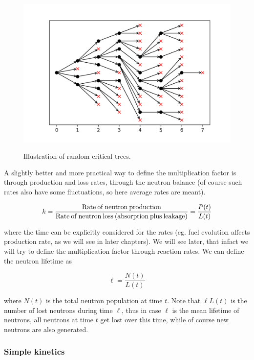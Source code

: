 \begin{figure}[ht!]
{\includegraphics[scale=0.44] {figures/02-randomtreeF.png}}\protect
\caption{\label{fig:randomtrees} \footnotesize{Illustration of random critical trees.}}
\end{figure}

A slightly better and more practical way to define the multiplication factor is through production and loss rates, through the neutron balance (of course such rates also have some fluctuations, so here average rates are meant).

\begin{equation}\label{eq:krates}
k = \frac{\rm {Rate \: of \: neutron \: production}}{\rm Rate \: of \: neutron \: loss \: (absorption \: plus \: leakage) } = \frac{P(t)}{L(t)}
\end{equation}


\noindent where the time can be explicitly considered for the rates (eg. fuel evolution affects production rate, as we will see in later chapters). We will see later, that infact we will try to define the multiplication factor through reaction rates. We can define the neutron lifetime as

\begin{equation}\label{eq:ell}
\ell=\frac{N(t)}{L(t)}
\end{equation}


\noindent where $N(t)$ is the total neutron population at time $t$. Note that $\ell L(t)$ is the number of lost neutrons during time $\ell$, thus in case $\ell$ is the mean lifetime of neutrons, all neutrons at time $t$ get lost over this time, while of course new neutrons are also generated.

\subsubsection*{Simple kinetics}

